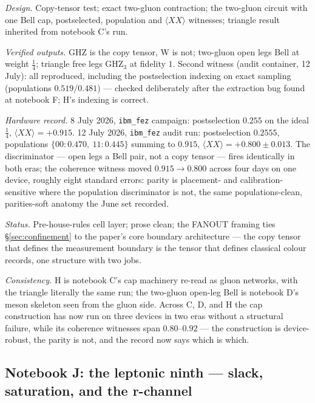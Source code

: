 \emph{Design.} Copy-tensor test; exact two-gluon contraction; the two-gluon circuit with one Bell
cap, postselected, population and $\langle XX\rangle$ witnesses; triangle result inherited from
notebook C's run.

\emph{Verified outputs.} GHZ is the copy tensor, W is not; two-gluon open legs Bell at weight
$\tfrac14$; triangle free legs GHZ$_{3}$ at fidelity $1$. Second witness (audit container,
12 July): all reproduced, including the postselection indexing on exact sampling (populations
$0.519/0.481$) --- checked deliberately after the extraction bug found at notebook F; H's
indexing is correct.

\emph{Hardware record.} 8 July 2026, \texttt{ibm\_fez} campaign: postselection $0.255$ on the
ideal $\tfrac14$, $\langle XX\rangle = +0.915$. 12 July 2026, \texttt{ibm\_fez} audit run:
postselection $0.2555$, populations $\{00: 0.470,\ 11: 0.445\}$ summing to $0.915$,
$\langle XX\rangle = +0.800 \pm 0.013$. The discriminator --- open legs a Bell pair, not a copy
tensor --- fires identically in both eras; the coherence witness moved $0.915 \to 0.800$ across
four days on one device, roughly eight standard errors: parity is placement- and
calibration-sensitive where the population discriminator is not, the same populations-clean,
parities-soft anatomy the June set recorded.

\emph{Status.} Pre-house-rules cell layer; prose clean; the FANOUT framing ties
\S\ref{sec:confinement} to the paper's core boundary architecture --- the copy tensor that
defines the measurement boundary is the tensor that defines classical colour records, one
structure with two jobs.

\emph{Consistency.} H is notebook C's cap machinery re-read as gluon networks, with the triangle
literally the same run; the two-gluon open-leg Bell is notebook D's meson skeleton seen from the
gluon side. Across C, D, and H the cap construction has now run on three devices in two eras
without a structural failure, while its coherence witnesses span $0.80$--$0.92$ --- the
construction is device-robust, the parity is not, and the record now says which is which.

\subsection{Notebook J: the leptonic ninth --- slack, saturation, and the r-channel}
\label{app:nb-J}

